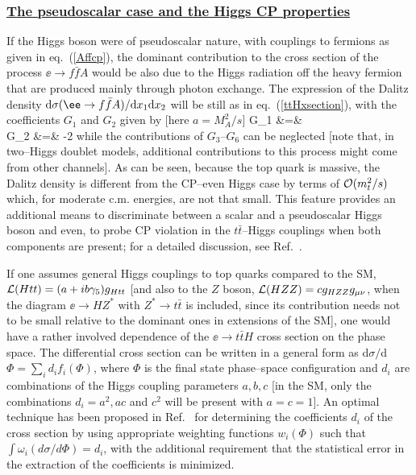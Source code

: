 {\subsubsection*{\underline{The pseudoscalar case and the Higgs CP properties}}

If the Higgs boson were of pseudoscalar nature, with couplings to fermions as 
given in eq.~(\ref{Affcp}), the dominant contribution to the cross section of 
the process $\ee\to f\bar{f}A$ would be also due to the Higgs radiation off the 
heavy fermion that are produced mainly through photon exchange. The expression 
of the Dalitz density ${\rm d} \sigma(\ee \to f\bar{f}A)/{\rm d}x_1 {\rm d} x_2$
will be still as in eq.~(\ref{ttHxsection}), with the coefficients $G_1$ and 
$G_2$ given by [here $a=M_A^2/s$] \cite{ee-ttH,ee-ttA}
\beq
G_1 &=&   \non \\
G_2 &=&  -2   
\eeq
while the contributions of $G_{3}$--$G_6$ can be neglected [note that, in
two--Higgs doublet models, additional contributions to this process might come 
from other channels]. As can be seen, because the top quark is massive, 
the Dalitz density is different from the CP--even Higgs case by terms of
${\cal O}(m_t^2/s)$ which, for moderate c.m. energies, are not that small. 
This feature provides an additional means to discriminate between a scalar
and a pseudoscalar Higgs boson and even, to probe CP violation in the 
$t\bar{t}$--Higgs couplings when both components are present; for a detailed 
discussion, see Ref.~\cite{ee-ttHspin}.\s

If one assumes general Higgs couplings to top quarks compared to the SM, ${\cal
L} (Htt) = (a+ib \gamma_5) g_{Htt}$ [and also to the $Z$ boson, ${\cal L} (HZZ)
= c g_{HZZ} g_{\mu \nu}$, when the diagram $\ee \to HZ^*$ with $Z^* \to t
\bar{t}$ is included, since its contribution needs not to be small relative to
the dominant ones in extensions of the SM], one would have a rather involved
dependence of the $\ee \to t\bar{t}H$ cross section on the phase space.  The
differential cross section can be written in a general form as d$\sigma/$d$\Phi
= \sum_i d_i f_i(\Phi)$, where $\Phi$ is the final state phase--space
configuration and $d_i$ are combinations of the Higgs coupling parameters
$a,b,c$ [in the SM, only the combinations $d_i\!=\! a^2,ac$ and $c^2$ will be
present with $a\!=\!c\!=\!1$]. An optimal technique has been proposed in
Ref.~\cite{ee-ttHspin} for determining the coefficients $d_i$ of the cross
section by using appropriate weighting functions $w_i(\Phi)$ such that $\int
\omega_i (d\sigma/d\Phi)=d_i$, with the additional requirement that the
statistical error in the extraction of the coefficients is minimized.  

}
